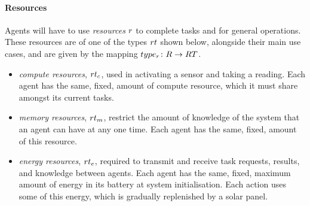 
\paragraph{Resources}
\label{section:overview:resources}

\newcommand{\varResourceType}[2]{\varSymbol{RT}{#1}{#2}}
\newcommand{\setResourceType}[2]{\setSymbol{RT}{#1}{#2}}
\newcommand{\varResourceTypeCompute}[2]{\varResourceType{c}{#2}}
\newcommand{\varResourceTypeEnergy}[2]{\varResourceType{e}{#2}}
\newcommand{\varResourceTypeMemory}[2]{\varResourceType{m}{#2}}
\newcommand{\varResourceCompute}[2]{\varResource{c}{#2}}
\newcommand{\varResourceEnergy}[2]{\varResource{e}{#2}}
\newcommand{\varResourceMemory}[2]{\varResource{m}{#2}}

\newcommand{\formalResourceType}[2]{
	\functionFormal{type_r}
	{\setResource{}{}}
	{\setResourceType{}{}}
}
\newcommand{\functionResourceType}[2]{
	\functionSignature{type_r}
	{\varResource{}{}}}
Agents will have to use \textit{resources} $\varResource{}{}$ to complete tasks and for general operations. These resources are of one of the types $\varResourceType{}{}$ shown below, alongside their main use cases, and are given by the mapping $\formalResourceType{}{}$.

\begin{itemize}
	\item \textit{compute resources}, $\varResourceTypeCompute{}{}$,  used in activating a sensor and taking a reading. Each agent has the same, fixed, amount of compute resource, which it must share amongst its current tasks.
	
	\item \textit{memory resources}, $\varResourceTypeMemory{}{}$,  restrict the amount of knowledge of the system that an agent can have at any one time. Each agent has the same, fixed, amount of this resource.

	\item \textit{energy resources}, $\varResourceTypeEnergy{}{}$,  required to transmit and receive task requests, results, and knowledge between agents. Each agent has the same, fixed, maximum amount of energy in its battery at system initialisation. Each action uses some of this energy, which is gradually replenished by a solar panel.
\end{itemize}

